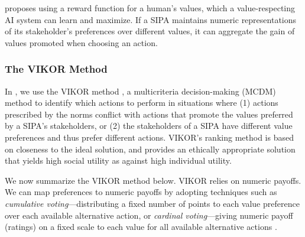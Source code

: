 \citet{Sotala2017HumanValues} proposes using a reward function for a
human's values, which a value-respecting AI system can learn and 
maximize. If a SIPA maintains numeric representations of its
stakeholder's preferences over different values, it can aggregate the gain
of values promoted when choosing an action.

\subsubsection{The VIKOR Method}


In \frameworkAinur, we use the VIKOR
method \citep{opricovic2004compromise}, a multicriteria decision-making (MCDM) method to identify which
actions to perform in situations where (1) actions prescribed by the norms
conflict with actions that promote the values preferred by a SIPA's
stakeholders, or (2) the stakeholders of a SIPA have different value
preferences and thus prefer different actions.
VIKOR's ranking method is based on closeness to the ideal solution, and provides an ethically appropriate solution that yields high social utility as against high individual utility.

We now summarize the VIKOR method  \citep{opricovic2004compromise} below. 
VIKOR relies on numeric payoffs. 
We can map preferences to numeric payoffs by adopting techniques such as \emph{cumulative voting}---distributing a fixed number of points to each value preference over each available alternative action, or \emph{cardinal voting}---giving numeric payoff (ratings) on a fixed scale to each value for all available alternative actions \citep{pacuit-voting-methods}. 

